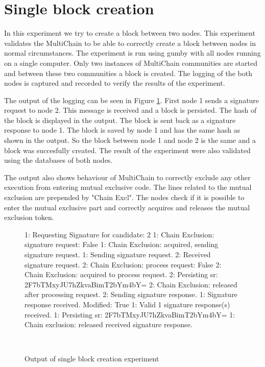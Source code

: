 \section{Single block creation}
In this experiment we try to create a block between two nodes.
This experiment validates the MultiChain to be able to correctly create a block between nodes in normal circumstances.
The experiment is run using gumby with all nodes running on a single computer.
Only two instances of MultiChain communities are started and between these two communities a block is created.
The logging of the both nodes is captured and recorded to verify the results of the experiment.

The output of the logging can be seen in Figure \ref{fig:singleblockexperiment}.
First node 1 sends a signature request to node 2.
This message is received and a block is persisted.
The hash of the block is displayed in the output.
The block is sent back as a signature response to node 1.
The block is saved by node 1 and has the same hash as shown in the output.
So the block between node 1 and node 2 is the same and a block was succesfully created.
The result of the experiment were also validated using the databases of both nodes.

The output also shows behaviour of MultiChain
to correctly exclude any other execution from entering mutual exclusive code.
The lines related to the mutual exclusion are prepended by "Chain Excl".
The nodes check if it is possible to enter the mutual exclusive part and correctly acquires
and releases the mutual exclusion token.

\begin{figure}
\begin{FVerbatim}[fontsize=\small]
1: Requesting Signature for candidate: 2
1: Chain Exclusion: signature request: False
1: Chain Exclusion: acquired, sending signature request.
1: Sending signature request.
2: Received signature request.
2: Chain Exclusion: process request: False
2: Chain Exclusion: acquired to process request.
2: Persisting sr: 2F7bTMxyJU7hZkvaBimT2bYm4bY=
2: Chain Exclusion: released after processing request.
2: Sending signature response.
1: Signature response received. Modified: True
1: Valid 1 signature response(s) received.
1: Persisting sr: 2F7bTMxyJU7hZkvaBimT2bYm4bY=
1: Chain exclusion: released received signature response.
\end{FVerbatim}
    \caption{Output of single block creation experiment}~\label{fig:singleblockexperiment}
\end{figure}
